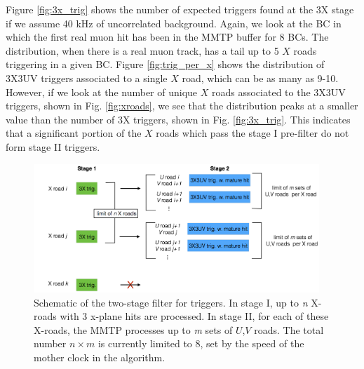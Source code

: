 Figure \ref{fig:3x_trig} shows the number of expected triggers found at the 3X stage if we assume 40 kHz of uncorrelated background. Again, we look at the BC in which the first real muon hit has been in the MMTP buffer for 8 BCs. The distribution, when there is a real muon track, has a tail up to 5 $X$ roads triggering in a given BC. Figure \ref{fig:trig_per_x} shows the distribution of 3X3UV triggers associated to a single $X$ road, which can be as many as 9-10. However, if we look at the number of unique $X$ roads associated to the 3X3UV triggers, shown in Fig. \ref{fig:xroads}, we see that the distribution peaks at a smaller value than the number of 3X triggers, shown in Fig. \ref{fig:3x_trig}. This indicates that a significant portion of the $X$ roads which pass the stage I pre-filter do not form stage II triggers.
\begin{figure}[!htpb]
  \begin{center}
    \includegraphics[width=0.96\textwidth]{figures/multistage.pdf}
  \end{center}
  \vspace{-10pt}
  \caption{Schematic of the two-stage filter for triggers. In stage I, up to \textit{n} X-roads with 3 x-plane hits are processed. In stage II, for each of these X-roads, the MMTP processes up to \textit{m} sets of $U$,$V$ roads. The total number $n \times m$ is currently limited to 8, set by the speed of the mother clock in the algorithm. }
  \label{fig:mstage}
\end{figure}
